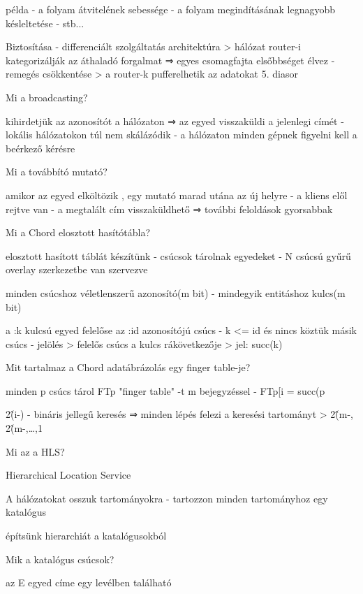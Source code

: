 \documentclass[12pt]{article}
\begin{document}
\begin{description}
    \item példa
        - a folyam átvitelének sebessége
        - a folyam megindításának legnagyobb késleltetése
        - stb...
    \item Biztosítása
        - differenciált szolgáltatás architektúra
        > hálózat router-i kategorizálják az áthaladó forgalmat 
        ⇒ egyes csomagfajta elsőbbséget élvez
        - remegés csökkentése
        > a router-k pufferelhetik az adatokat
        5. diasor
    \item  Mi a broadcasting?
    \item kihirdetjük az azonosítót a hálózaton ⇒ az egyed visszaküldi a jelenlegi címét
        - lokális hálózatokon túl nem skálázódik
        - a hálózaton minden gépnek figyelni kell a beérkező kérésre 
    \item  Mi a továbbító mutató?
    \item amikor az egyed elköltözik , egy mutató marad utána az új helyre
        - a kliens elől rejtve van
        - a megtalált cím visszaküldhető ⇒ további feloldások gyorsabbak
    \item  Mi a Chord elosztott hasítótábla?
    \item elosztott hasított táblát készítünk
        - csúcsok tárolnak egyedeket
        - N csúcsú gyűrű overlay szerkezetbe van szervezve
    \item minden csúcshoz véletlenszerű azonosító(m bit)
        - mindegyik entitáshoz kulcs(m bit)
    \item a :k kulcsú egyed felelőse az :id azonosítójú csúcs
        - k <= id és nincs köztük másik csúcs
        - jelölés
        > felelős csúcs a kulcs rákövetkezője
        > jel: succ(k)
    \item  Mit tartalmaz a Chord adatábrázolás egy finger table-je?
    \item minden p csúcs tárol FTp "finger table" -t m bejegyzéssel
        - FTp[i = succ(p\item2\^(i-)
            - bináris jellegű keresés ⇒ minden lépés felezi a keresési tartományt
            > 2\^(m-, 2\^(m-,\ldots,1
        \item  Mi az a HLS?
        \item Hierarchical Location Service
        \item A hálózatokat osszuk tartományokra
            - tartozzon minden tartományhoz egy katalógus
        \item építsünk hierarchiát a katalógusokból
        \item  Mik a katalógus csúcsok?
        \item az E egyed címe egy levélben található

\end{description}
\end{document}
